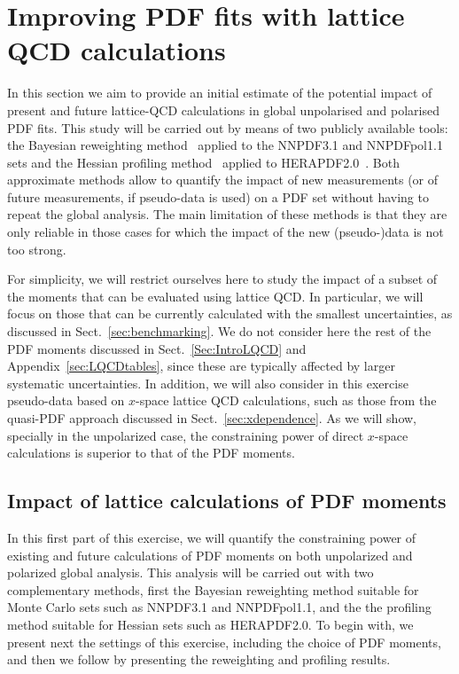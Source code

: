 \section{Improving PDF fits with lattice QCD calculations}
\label{sec:projections}

In this section we aim to provide an initial estimate of the potential
impact of present and future lattice-QCD calculations
in global unpolarised and polarised PDF fits.
%
This study will be carried out by means of two publicly available
tools: the
Bayesian reweighting
method~\cite{Ball:2011gg,Ball:2010gb} applied to the
NNPDF3.1 and NNPDFpol1.1 sets and the Hessian
profiling method~\cite{Camarda:2015zba} applied to
HERAPDF2.0~\cite{Abramowicz:2015mha}.
%
Both approximate methods allow to quantify the impact of new measurements
(or of future measurements, if pseudo-data is used) on a PDF set without
having to repeat the global analysis.
%
The main limitation of these methods is that they are only reliable
in those cases for which the impact of the new (pseudo-)data
is not too strong.

For simplicity, we will restrict  ourselves here to study the
impact of a subset of the moments that can be
evaluated using lattice QCD.
%
In particular,
we will focus on those that can be currently calculated
with the smallest uncertainties, as discussed in
Sect.~\ref{sec:benchmarking}.
%
We do not consider here
the rest of the PDF moments discussed in
Sect.~\ref{Sec:IntroLQCD} and Appendix~\ref{sec:LQCDtables},
since these are typically affected by larger systematic uncertainties.
%
In addition, we
will also consider in this exercise pseudo-data based on $x$-space
lattice QCD calculations, such as those from the quasi-PDF approach
discussed in Sect.~\ref{sec:xdependence}.
%
As we will show, specially in the unpolarized case, the
constraining power of direct $x$-space calculations is
superior to that of the PDF moments.

\subsection{Impact of lattice calculations of PDF moments}
In this first part of this exercise, we will quantify the
constraining power of existing and future calculations
of PDF moments on both unpolarized and polarized
global analysis.
%
This analysis will be carried out with two complementary methods,
first the Bayesian reweighting method suitable
for Monte Carlo sets such as NNPDF3.1 and
NNPDFpol1.1, and the the profiling method suitable
for Hessian sets such as HERAPDF2.0.
%
To begin with, we present next the settings of this exercise,
including the choice of PDF moments, and then we follow
by presenting the reweighting and profiling results.

